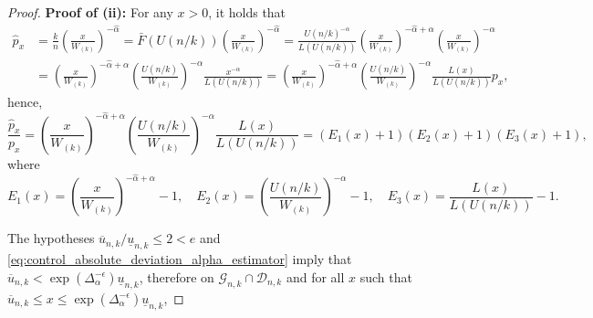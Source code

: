 \documentclass{article}
\numberwithin{equation}{section}
\begin{document}
\begin{proof}
    \textbf{Proof of (ii):} For any \(x>0\), it holds that
    \begin{align*}
        \widehat{p}_x & = \frac{k}{n}
        \left(\frac{x}{W_{(k)}}\right)^{-\widehat \alpha} =
        \bar{F}\left(U(n/k)\right)\left(\frac{x}{W_{(k)}}\right)^{-\widehat
        \alpha} =
        \frac{U(n/k)^{-\alpha}}{L(U(n/k))}\left(\frac{x}{W_{(k)}}\right)^{-\widehat
        \alpha+\alpha}\left(\frac{x}{W_{(k)}}\right)^{-\alpha}
        \\
        & = \left(\frac{x}{W_{(k)}}\right)^{-\widehat
        \alpha+\alpha}\left(\frac{U(n/k)}{W_{(k)}}\right)^{-\alpha}\frac{x^{-\alpha}}{L(U(n/k))}
        = \left(\frac{x}{W_{(k)}}\right)^{-\widehat
        \alpha+\alpha}\left(\frac{U(n/k)}{W_{(k)}}\right)^{-\alpha}
        \frac{L(x)}{L(U(n/k))} p_{x},
    \end{align*}
    hence,
    \begin{equation}\label{eq:ratio_product_decomposition}
        \frac{\widehat{p}_x}{p_x} =
        \left(\frac{x}{W_{(k)}}\right)^{-\widehat
        \alpha+\alpha}\left(\frac{U(n/k)}{W_{(k)}}\right)^{-\alpha}
        \frac{L(x)}{L(U(n/k))} =
        \left(E_1(x)+1\right)\left(E_2(x)+1\right)\left(E_3(x)+1\right),
    \end{equation}
    where
    \begin{equation*}
        E_1(x) = \left(\frac{x}{W_{(k)}}\right)^{-\widehat
        \alpha+\alpha} -1, \quad
        E_2(x) = \left(\frac{U(n/k)}{W_{(k)}}\right)^{-\alpha} -1, \quad
        E_3(x) = \frac{L(x)}{L(U(n/k))} -1.
    \end{equation*}

    The hypotheses \(\overline u_{n,k} /\underline u_{n,k} \le 2<e\)
    and
    \eqref{eq:control_absolute_deviation_alpha_estimator} imply
    that \(\overline{u}_{n,k} <
    \exp{\left(\Delta_\alpha^{-\epsilon}\right)}\underline{u}_{n,k}\),
    therefore on \(\mathcal{G}_{n,k}\cap\mathcal{D}_{n,k}\) and for
    all \(x\) such that \(\overline{u}_{n,k}\leq x\leq
    \exp{\left(\Delta_\alpha^{-\epsilon}\right)}\underline{u}_{n,k}\),


\end{proof}
\end{document}
